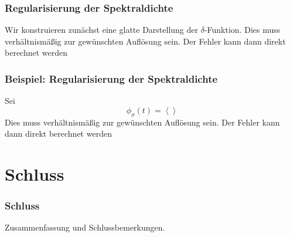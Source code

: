 \documentclass{beamer}
\begin{document}
\begin{frame}
    \frametitle{Regularisierung der Spektraldichte}
    Wir konstruieren zunächst eine glatte Darstellung der $\delta$-Funktion.
    Dies muss verhältnismäßig zur gewünschten Auflösung sein.
    Der Fehler kann dann direkt berechnet werden
\end{frame}

\begin{frame}
    \frametitle{Beispiel: Regularisierung der Spektraldichte}
    Sei $$\phi_{\sigma}(t) = \left \langle \right \rangle$$
    Dies muss verhältnismäßig zur gewünschten Auflösung sein.
    Der Fehler kann dann direkt berechnet werden
\end{frame}

\section{Schluss}

\begin{frame}
\frametitle{Schluss}
Zusammenfassung und Schlussbemerkungen.
\end{frame}
\end{document}
